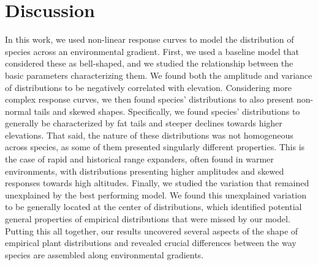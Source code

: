 \documentclass[11pt, a4paper]{article}
\begin{document}

\section*{Discussion}
In this work, we used non-linear response curves to model the distribution of species across an environmental gradient. First, we used a baseline model that considered these as bell-shaped, and we studied the relationship between the basic parameters characterizing them. We found both the amplitude and variance of distributions to be negatively correlated with elevation. Considering more complex response curves, we then found species' distributions to also present non-normal tails and skewed shapes. Specifically, we found species' distributions to generally be characterized by fat tails and steeper declines towards higher elevations. That said, the nature of these distributions was not homogeneous across species, as some of them presented singularly different properties. This is the case of rapid and historical range expanders, often found in warmer environments, with distributions presenting higher amplitudes and skewed responses towards high altitudes. Finally, we studied the variation that remained unexplained by the best performing model. We found this unexplained variation to be generally located at the center of distributions, which identified potential general properties of empirical distributions that were missed by our model. Putting this all together, our results uncovered several aspects of the shape of empirical plant distributions and revealed crucial differences between the way species are assembled along environmental gradients. 
\end{document}
